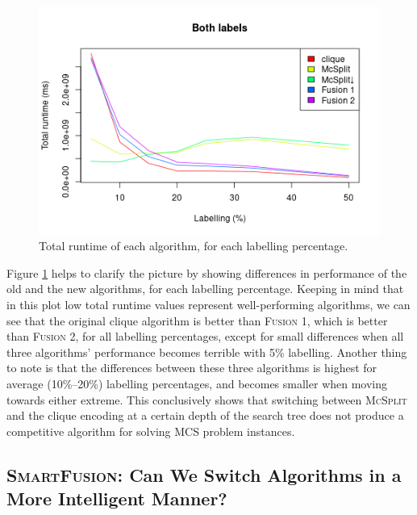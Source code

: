 \documentclass{l4proj}
\theoremstyle{definition}
\theoremstyle{remark}
\begin{document}
\begin{figure}
  \centering
  \includegraphics[scale=0.5]{images/fusion_linechart.png}
  \caption{Total runtime of each algorithm, for each labelling percentage.}
  \label{fig:fusion_lines}
\end{figure}

Figure \ref{fig:fusion_lines} helps to clarify the picture by showing
differences in performance of the old and the new algorithms, for each labelling
percentage. Keeping in mind that in this plot low total runtime values represent
well-performing algorithms, we can see that the original clique algorithm is
better than \textsc{Fusion 1}, which is better than \textsc{Fusion 2}, for all
labelling percentages, except for small differences when all three algorithms'
performance becomes terrible with 5\% labelling. Another thing to note is that
the differences between these three algorithms is highest for average
(10\%--20\%) labelling percentages, and becomes smaller when moving towards
either extreme. This conclusively shows that switching between \textsc{McSplit}
and the clique encoding at a certain depth of the search tree does not produce a
competitive algorithm for solving MCS problem instances.

\subsection{\textsc{SmartFusion}: Can We Switch Algorithms in a More Intelligent
  Manner?}
\end{document}
